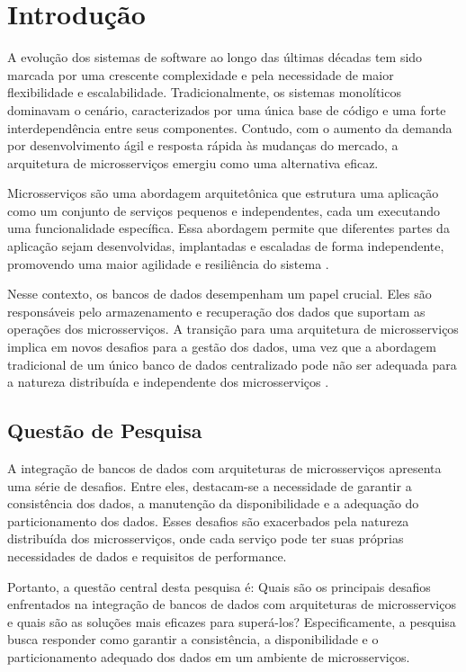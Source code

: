 \chapter{Introdução}

A evolução dos sistemas de software ao longo das últimas décadas tem sido marcada por uma crescente complexidade e pela necessidade de maior flexibilidade e escalabilidade. Tradicionalmente, os sistemas monolíticos dominavam o cenário, caracterizados por uma única base de código e uma forte interdependência entre seus componentes. Contudo, com o aumento da demanda por desenvolvimento ágil e resposta rápida às mudanças do mercado, a arquitetura de microsserviços emergiu como uma alternativa eficaz.

Microsserviços são uma abordagem arquitetônica que estrutura uma aplicação como um conjunto de serviços pequenos e independentes, cada um executando uma funcionalidade específica. Essa abordagem permite que diferentes partes da aplicação sejam desenvolvidas, implantadas e escaladas de forma independente, promovendo uma maior agilidade e resiliência do sistema \cite{newman2019}.

Nesse contexto, os bancos de dados desempenham um papel crucial. Eles são responsáveis pelo armazenamento e recuperação dos dados que suportam as operações dos microsserviços. A transição para uma arquitetura de microsserviços implica em novos desafios para a gestão dos dados, uma vez que a abordagem tradicional de um único banco de dados centralizado pode não ser adequada para a natureza distribuída e independente dos microsserviços \cite{richardson2018}.

\section{Questão de Pesquisa}

A integração de bancos de dados com arquiteturas de microsserviços apresenta uma série de desafios. Entre eles, destacam-se a necessidade de garantir a consistência dos dados, a manutenção da disponibilidade e a adequação do particionamento dos dados. Esses desafios são exacerbados pela natureza distribuída dos microsserviços, onde cada serviço pode ter suas próprias necessidades de dados e requisitos de performance.

Portanto, a questão central desta pesquisa é: Quais são os principais desafios enfrentados na integração de bancos de dados com arquiteturas de microsserviços e quais são as soluções mais eficazes para superá-los? Especificamente, a pesquisa busca responder como garantir a consistência, a disponibilidade e o particionamento adequado dos dados em um ambiente de microsserviços.

